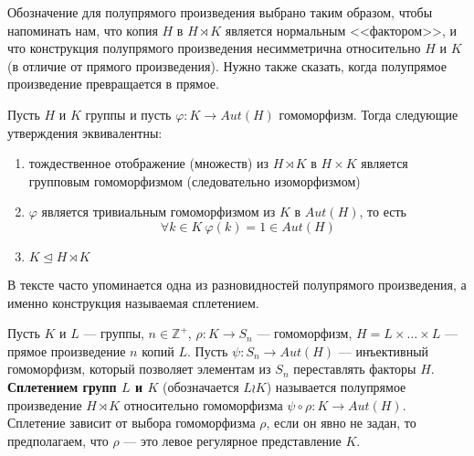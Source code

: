 Обозначение для полупрямого произведения выбрано таким образом, чтобы напоминать нам, что копия $H$ в $H \rtimes K$ является нормальным <<фактором>>, и что конструкция полупрямого произведения несимметрична относительно $H$ и $K$ (в отличие от прямого произведения). Нужно также сказать, когда полупрямое произведение превращается в прямое.

\begin{prop}\cite[177]{Dummit99}
  Пусть $H$ и $K$ группы и пусть $\varphi:K \rightarrow Aut(H)$ гомоморфизм. Тогда следующие утверждения эквивалентны:
  \begin{enumerate}[(1)]
    \item тождественное отображение (множеств) из $H \rtimes K$ в $H \times K$ является групповым гомоморфизмом (следовательно изоморфизмом)
    \item $\varphi$ является тривиальным гомоморфизмом из $K$ в $Aut(H)$, то есть 
    \[
    	\forall k \in K \ \varphi(k)=1 \in Aut(H)
    \]
    \item $K \unlhd H \rtimes K$
  \end{enumerate}
\end{prop}

В тексте часто упоминается одна из разновидностей полупрямого произведения, а именно конструкция называемая сплетением.
\begin{definition}\label{def:wreath_product}
  Пусть $K$ и $L$ --- группы, $n \in \mathbb{Z}^+$, $\rho:K \rightarrow S_n$ --- гомоморфизм, $H=L \times \ldots \times L$ --- прямое произведение $n$ копий $L$. Пусть $\psi: S_n \rightarrow Aut(H)$ --- инъективный гомоморфизм, который позволяет элементам из $S_n$ переставлять факторы $H$. \textbf{Сплетением групп $L$ и $K$} (обозначается $L \wr K$) называется полупрямое произведение $H \rtimes K$ относительно гомоморфизма $\psi \circ \rho: K \to Aut(H)$. Сплетение зависит от выбора гомоморфизма $\rho$, если он явно не задан, то предполагаем, что $\rho$ --- это левое регулярное представление $K$.
\end{definition}












